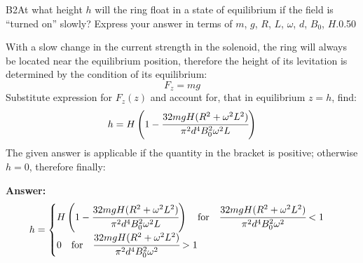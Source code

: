 \documentclass[11pt,a4paper]{article}
\begin{document}
\begin{solcard}{B2}{At what height $h$ will the ring float in a state of equilibrium if the field is “turned on” slowly? Express your answer in terms of $m$, $g$, $R$, $L$, $\omega$, $d$, $B_0$, $H$.}{0.50}

With a slow change in the current strength in the solenoid, the ring will always be located near the equilibrium position, therefore the height of its levitation is determined by the condition of its equilibrium: $$F_z=mg $$Substitute expression for $F_z(z)$ and account for, that in equilibrium $z=h$, find: $$h=H\left(1-\cfrac{32mgH(R^2+\omega^2L^2)}{\pi^2d^4B^2_0\omega^2L}\right) $$The given answer is applicable if the quantity in the bracket is positive; otherwise $h=0$, therefore finally:

\par\smallskip\noindent\textbf{Answer:} $$h=\begin{cases} H\left(1-\cfrac{32mgH(R^2+\omega^2L^2)}{\pi^2d^4B^2_0\omega^2L}\right)\quad\text{for}\quad \cfrac{32mgH(R^2+\omega^2L^2)}{\pi^2d^4B^2_0\omega^2}<1\\ 0\quad\text{for}\quad \cfrac{32mgH(R^2+\omega^2L^2)}{\pi^2d^4B^2_0\omega^2}>1 \end{cases} $$
\end{solcard}
\end{document}
